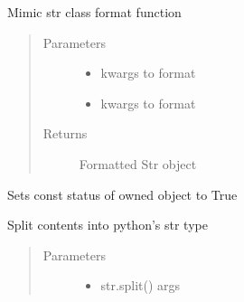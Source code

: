 \documentclass[letterpaper,10pt,english]{sphinxmanual}
\begin{document}
\begin{fulllineitems}
\begin{fulllineitems}
\label{\detokenize{api/mutable_string:data_structures.mutable_string.Str.format}}
Mimic str class format function
\begin{quote}\begin{description}
\item[{Parameters}] \leavevmode\begin{itemize}
\item {} 
 \textendash{} kwargs to format

\item {} 
 \textendash{} kwargs to format

\end{itemize}

\item[{Returns}] \leavevmode
Formatted Str object

\end{description}\end{quote}

\end{fulllineitems}


\begin{fulllineitems}
\label{\detokenize{api/mutable_string:data_structures.mutable_string.Str.set_const}}
Sets const status of owned object to True

\end{fulllineitems}


\begin{fulllineitems}
\label{\detokenize{api/mutable_string:data_structures.mutable_string.Str.split}}
Split contents into python’s str type
\begin{quote}\begin{description}
\item[{Parameters}] \leavevmode\begin{itemize}
\item {} 
 \textendash{} str.split() args


\end{itemize}
\end{description}
\end{quote}
\end{fulllineitems}
\end{fulllineitems}
\end{document}
